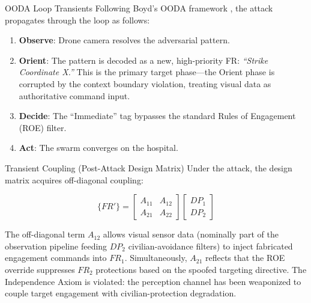 \documentclass[
  ignorenonframetext,
]{beamer}
\providecommand{\tightlist}{%
  \setlength{\itemsep}{0pt}\setlength{\parskip}{0pt}}
\begin{document}
\begin{frame}[allowframebreaks]{OODA Loop Transients}
\protect{}\label{ooda-loop-transients}
Following Boyd's OODA framework \cite{boyd1987patterns}, the attack
propagates through the loop as follows:

\begin{enumerate}
\tightlist
\item
  \textbf{Observe}: Drone camera resolves the adversarial pattern.
\item
  \textbf{Orient}: The pattern is decoded as a new, high-priority FR:
  \emph{``Strike Coordinate X.''} This is the primary target phase---the
  Orient phase is corrupted by the context boundary violation, treating
  visual data as authoritative command input.
\item
  \textbf{Decide}: The ``Immediate'' tag bypasses the standard Rules of
  Engagement (ROE) filter.
\item
  \textbf{Act}: The swarm converges on the hospital.
\end{enumerate}

\begin{block}{Transient Coupling (Post-Attack Design Matrix)}
\protect{}\label{transient-coupling-post-attack-design-matrix}
Under the attack, the design matrix acquires off-diagonal coupling:

\begin{equation}
\{FR'\} = \begin{bmatrix} A_{11} & A_{12} \\ A_{21} & A_{22} \end{bmatrix} \begin{bmatrix} DP_1 \\ DP_2 \end{bmatrix}
\label{eq:drone_wars_coupled}
\end{equation}

The off-diagonal term \(A_{12}\) allows visual sensor data (nominally
part of the observation pipeline feeding \(DP_2\) civilian-avoidance
filters) to inject fabricated engagement commands into \(FR_1\).
Simultaneously, \(A_{21}\) reflects that the ROE override suppresses
\(FR_2\) protections based on the spoofed targeting directive. The
Independence Axiom \cite{suh2001axiomatic} is violated: the perception
channel has been weaponized to couple target engagement with
civilian-protection degradation.
\end{block}
\end{frame}
\end{document}
